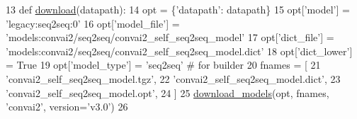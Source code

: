 \begin{DoxyCode}
13 \textcolor{keyword}{def }\hyperlink{namespaceparlai_1_1zoo_1_1convai2_1_1seq2seq_a85645a8dbd4e8a3d67f8acb231de4f6b}{download}(datapath):
14     opt = \{\textcolor{stringliteral}{'datapath'}: datapath\}
15     opt[\textcolor{stringliteral}{'model'}] = \textcolor{stringliteral}{'legacy:seq2seq:0'}
16     opt[\textcolor{stringliteral}{'model\_file'}] = \textcolor{stringliteral}{'models:convai2/seq2seq/convai2\_self\_seq2seq\_model'}
17     opt[\textcolor{stringliteral}{'dict\_file'}] = \textcolor{stringliteral}{'models:convai2/seq2seq/convai2\_self\_seq2seq\_model.dict'}
18     opt[\textcolor{stringliteral}{'dict\_lower'}] = \textcolor{keyword}{True}
19     opt[\textcolor{stringliteral}{'model\_type'}] = \textcolor{stringliteral}{'seq2seq'}  \textcolor{comment}{# for builder}
20     fnames = [
21         \textcolor{stringliteral}{'convai2\_self\_seq2seq\_model.tgz'},
22         \textcolor{stringliteral}{'convai2\_self\_seq2seq\_model.dict'},
23         \textcolor{stringliteral}{'convai2\_self\_seq2seq\_model.opt'},
24     ]
25     \hyperlink{namespaceparlai_1_1core_1_1build__data_ab697f23f05d3e36d7979fe5e0ed7911e}{download\_models}(opt, fnames, \textcolor{stringliteral}{'convai2'}, version=\textcolor{stringliteral}{'v3.0'})
26 \end{DoxyCode}
